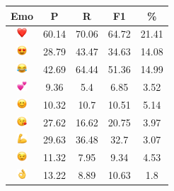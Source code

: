 \documentclass{article}
\begin{document}
\begin{table}
\centering
\begin{tabular}{|c|ccc|c|} \hline
\textbf{Emo} & \textbf{P} & \textbf{R} & \textbf{F1} & \textbf{\%} \\ \hline
\includegraphics[height=0.37cm,width=0.37cm]{img/red_heart.png} & 60.14 & 70.06 & 64.72 & 21.41\\ 
\includegraphics[height=0.37cm,width=0.37cm]{img/smiling_face_with_hearteyes.png} & 28.79 & 43.47 & 34.63 & 14.08\\ 
\includegraphics[height=0.37cm,width=0.37cm]{img/face_with_tears_of_joy.png} & 42.69 & 64.44 & 51.36 & 14.99\\ 
\includegraphics[height=0.37cm,width=0.37cm]{img/two_hearts.png} & 9.36 & 5.4 & 6.85 & 3.52\\ 
\includegraphics[height=0.37cm,width=0.37cm]{img/smiling_face_with_smiling_eyes.png} & 10.32 & 10.7 & 10.51 & 5.14\\ 
\includegraphics[height=0.37cm,width=0.37cm]{img/face_blowing_a_kiss.png} & 27.62 & 16.62 & 20.75 & 3.97\\ 
\includegraphics[height=0.37cm,width=0.37cm]{img/flexed_biceps.png} & 29.63 & 36.48 & 32.7 & 3.07\\ 
\includegraphics[height=0.37cm,width=0.37cm]{img/winking_face.png} & 11.32 & 7.95 & 9.34 & 4.53\\ 
\includegraphics[height=0.37cm,width=0.37cm]{img/OK_hand.png} & 13.22 & 8.89 & 10.63 & 1.8\\ 

\end{tabular}
\end{table}
\end{document}
